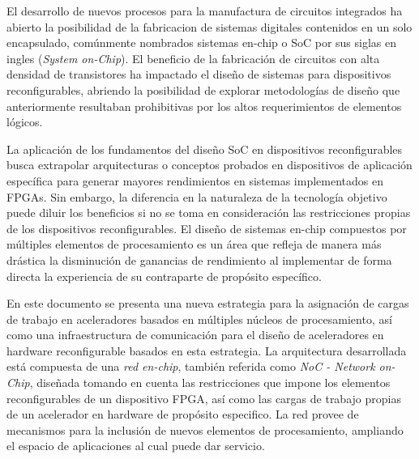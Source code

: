 
El desarrollo de nuevos procesos para la manufactura de circuitos integrados ha abierto la posibilidad de la fabricacion de sistemas digitales contenidos en un solo encapsulado, comúnmente nombrados sistemas en-chip o SoC por sus siglas en ingles (\textit{System on-Chip}). El beneficio de la fabricación de circuitos con alta densidad de transistores ha impactado el diseño de sistemas para dispositivos reconfigurables, abriendo la posibilidad de explorar metodologías de diseño que anteriormente resultaban prohibitivas por los altos requerimientos de elementos lógicos.

La aplicación de los fundamentos del diseño SoC en dispositivos reconfigurables busca extrapolar arquitecturas o conceptos probados en dispositivos de aplicación específica para generar mayores rendimientos en sistemas implementados en FPGAs. Sin embargo, la diferencia en la naturaleza de la tecnología objetivo puede diluir los beneficios si no se toma en consideración las restricciones propias de los dispositivos reconfigurables. El diseño de sistemas en-chip compuestos por múltiples elementos de procesamiento es un área que refleja de manera más drástica la disminución de ganancias de rendimiento al implementar de forma directa la experiencia de su contraparte de propósito específico.

En este documento se presenta una nueva estrategia para la asignación de cargas de trabajo en aceleradores basados en múltiples núcleos de procesamiento, así como una infraestructura de comunicación para el diseño de aceleradores en hardware reconfigurable basados en esta estrategia. La arquitectura desarrollada está compuesta de una \textit{red en-chip}, también referida como \textit{NoC - Network on-Chip}, diseñada tomando en cuenta las restricciones que impone los elementos reconfigurables de un dispositivo FPGA, así como las cargas de trabajo propias de un acelerador en hardware de propósito especifico. La red provee de mecanismos para la inclusión de nuevos elementos de procesamiento, ampliando el espacio de aplicaciones al cual puede dar servicio.